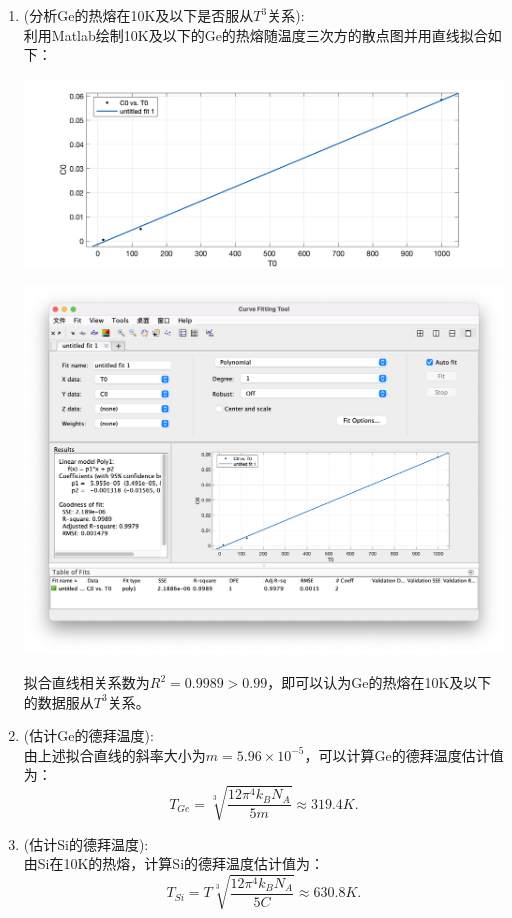 \documentclass[reqno,a4paper,12pt]{amsart}
\begin{document}
\begin{enumerate}
	\item (分析Ge的热熔在10K及以下是否服从$T^3$关系): \\
	利用Matlab绘制10K及以下的Ge的热熔随温度三次方的散点图并用直线拟合如下：
	\begin{center}
		\includegraphics[scale = 0.3]{Ge_C_T_less10K.png}
	\end{center}
	\begin{center}
		\includegraphics[scale = 0.3]{Ge_C_T_less10Kdata.png}
	\end{center}
	拟合直线相关系数为$R^2 = 0.9989 > 0.99$，即可以认为Ge的热熔在10K及以下的数据服从$T^3$关系。
	
	\item (估计Ge的德拜温度): \\
	由上述拟合直线的斜率大小为$m = 5.96\times 10^{-5}$，可以计算Ge的德拜温度估计值为：
	\[
		T_{Ge} = \sqrt[3]{\frac{12\pi^4k_BN_A}{5m}} \approx 319.4K.
	\]
	
	\item (估计Si的德拜温度): \\
	由Si在10K的热熔，计算Si的德拜温度估计值为：
	\[
		T_{Si} = T\sqrt[3]{\frac{12\pi^4k_BN_A}{5C}} \approx 630.8K.
	\]
\end{enumerate}
\end{document}

